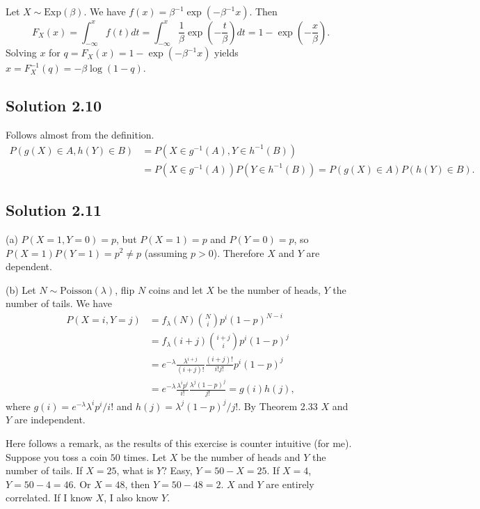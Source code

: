 Let $X \sim \mathrm{Exp}(\beta)$.
We have $f(x) = \beta^{-1} \exp(-\beta^{-1}x)$.
Then
$$
F_X(x) = \int_{-\infty}^x f(t)dt
    = \int_{-\infty}^x \frac{1}{\beta} \exp\left(-\frac{t}{\beta}\right) dt
    = 1 - \exp\left(-\frac{x}{\beta}\right).
$$
Solving $x$ for $q = F_X(x) = 1 - \exp(-\beta^{-1}x)$ yields $x = F_X^{-1}(q) = -\beta \log(1 - q)$.


\subsection*{Solution 2.10}

Follows almost from the definition.
\begin{equation*}
\begin{split}
P(g(X) \in A, h(Y) \in B)
    &= P(X \in g^{-1}(A), Y \in h^{-1}(B)) \\
    &= P(X \in g^{-1}(A)) P(Y \in h^{-1}(B))
    = P(g(X) \in A) P(h(Y) \in B).
\end{split}
\end{equation*}


\subsection*{Solution 2.11}

(a) $P(X = 1, Y = 0) = p$, but $P(X = 1) = p$ and $P(Y = 0) = p$, so $P(X = 1)P(Y = 1) = p^2 \neq p$ (assuming $p > 0$).
Therefore $X$ and $Y$ are dependent.

(b) Let $N \sim \mathrm{Poisson}(\lambda)$, flip $N$ coins and let $X$ be the number of heads, $Y$ the number of tails.
We have
\begin{equation*}
\begin{split}
P(X = i, Y = j)
    &= f_{\lambda}(N) \binom{N}{i} p^i (1 - p)^{N - i} \\
    &= f_{\lambda}(i + j) \binom{i + j}{i} p^i (1 - p)^j \\
    &= e^{-\lambda} \frac{\lambda^{i + j}}{(i + j)!} \frac{(i + j)!}{i! j!} p^i (1 - p)^j \\
    &= e^{-\lambda} \frac{\lambda^i p^i}{i!} \frac{\lambda^j (1 - p)^j}{j!} = g(i) h(j),
\end{split}
\end{equation*}
where $g(i) = e^{-\lambda} \lambda^i p^i / i!$ and $h(j) = \lambda^j (1 - p)^j / j!$.
By Theorem 2.33 $X$ and $Y$ are independent.

Here follows a remark, as the results of this exercise is counter intuitive (for me).
Suppose you toss a coin $50$ times.
Let $X$ be the number of heads and $Y$ the number of tails.
If $X = 25$, what is $Y$? Easy, $Y = 50 - X = 25$.
If $X = 4$, $Y = 50 - 4 = 46$.
Or $X = 48$, then $Y = 50 - 48 = 2$.
$X$ and $Y$ are entirely correlated.
If I know $X$, I also know $Y$.

